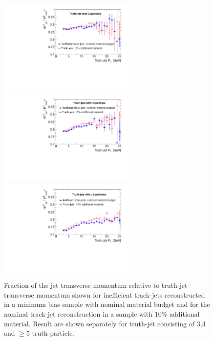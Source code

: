 \begin{figure}[tp]
\centering
\includegraphics[width=0.60\textwidth]{figure/trackjet/T7/inef_10cent_pt_3S.pdf}
\includegraphics[width=0.60\textwidth]{figure/trackjet/T7/inef_10cent_pt_4S.pdf}
\includegraphics[width=0.60\textwidth]{figure/trackjet/T7/inef_10cent_pt_5S.pdf}
\caption{Fraction of the jet transverse momentum relative to truth-jet transverse momentum shown for 
	 inefficient track-jets reconstructed in a minimum bias 
	sample with nominal material budget and for the nominal track-jet reconstruction in a sample with 10\% additional material.
	Result are shown separately for truth-jet consisting of 3,4 and $\geq 5$ truth particle.}

\label{fig:tj10tjex_pt}
\end{figure}    



